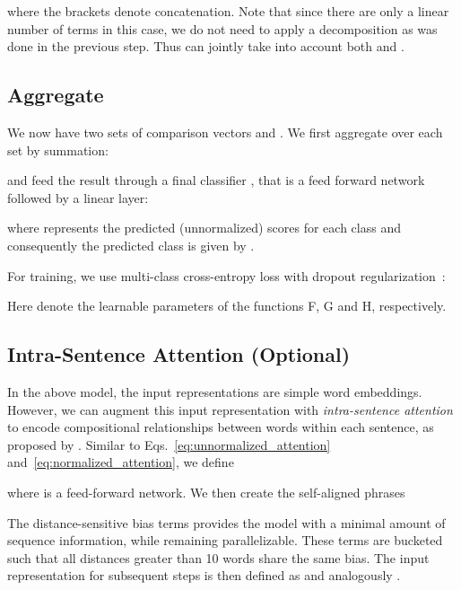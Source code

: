 \documentclass[11pt,letterpaper]{article}
\begin{document}
where the brackets  denote concatenation. Note that since there are only a linear number of terms in this case, we do not need to apply a decomposition as was done in the previous step. Thus  can jointly take into account both  and .

\subsection{Aggregate}
We now have two sets of comparison vectors  and . We first aggregate over each set by summation:

and feed the result through a final classifier , that is a feed forward network followed by a linear layer:

where  represents the predicted (unnormalized) scores for each class and consequently the predicted class is given by .

For training, we use multi-class cross-entropy loss with dropout regularization~\cite{srivastava2014dropout}:

Here  denote the learnable parameters of the functions F, G and H, respectively.



\subsection{Intra-Sentence Attention (Optional)}
\label{subsec:intra}
In the above model, the input representations are simple word embeddings. However, we can augment this input representation with \emph{intra-sentence attention} to encode compositional relationships between words within each sentence, as proposed by .
Similar to Eqs.~\ref{eq:unnormalized_attention} and~\ref{eq:normalized_attention}, we define

where  is a feed-forward network. We then create the self-aligned phrases

The distance-sensitive bias terms  provides the model with a minimal amount of sequence information, while remaining parallelizable.
These terms are bucketed such that all distances greater than 10 words share the same bias.
The input representation for subsequent steps is then defined as  and analogously .
\end{document}
